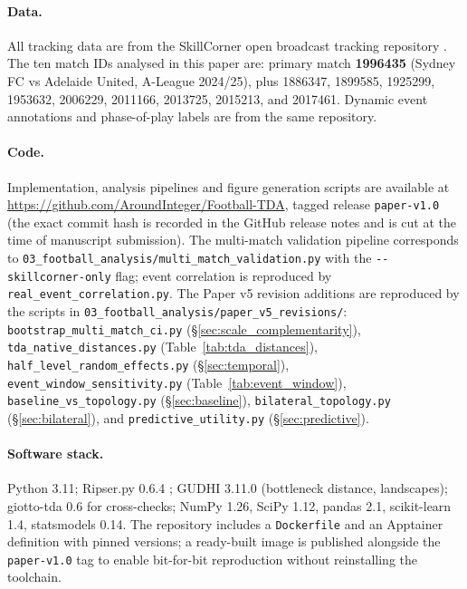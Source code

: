 \documentclass[11pt,a4paper]{article}
\begin{document}
\paragraph{Data.} All tracking data are from the SkillCorner open broadcast tracking repository \citep{SkillCorner2024}. The ten match IDs analysed in this paper are: primary match \textbf{1996435} (Sydney FC vs Adelaide United, A-League 2024/25), plus 1886347, 1899585, 1925299, 1953632, 2006229, 2011166, 2013725, 2015213, and 2017461. Dynamic event annotations and phase-of-play labels are from the same repository.

\paragraph{Code.} Implementation, analysis pipelines and figure generation scripts are available at \url{https://github.com/AroundInteger/Football-TDA}, tagged release \texttt{paper-v1.0} (the exact commit hash is recorded in the GitHub release notes and is cut at the time of manuscript submission). The multi-match validation pipeline corresponds to \texttt{03\_football\_analysis/multi\_match\_validation.py} with the \texttt{-{}-skillcorner-only} flag; event correlation is reproduced by \texttt{real\_event\_correlation.py}. The Paper v5 revision additions are reproduced by the scripts in \texttt{03\_football\_analysis/paper\_v5\_revisions/}: \texttt{bootstrap\_multi\_match\_ci.py} (\S\ref{sec:scale_complementarity}), \texttt{tda\_native\_distances.py} (Table~\ref{tab:tda_distances}), \texttt{half\_level\_random\_effects.py} (\S\ref{sec:temporal}), \texttt{event\_window\_sensitivity.py} (Table~\ref{tab:event_window}), \texttt{baseline\_vs\_topology.py} (\S\ref{sec:baseline}), \texttt{bilateral\_topology.py} (\S\ref{sec:bilateral}), and \texttt{predictive\_utility.py} (\S\ref{sec:predictive}).

\paragraph{Software stack.} Python 3.11; Ripser.py 0.6.4 \citep{Tralie2018}; GUDHI 3.11.0 (bottleneck distance, landscapes); giotto-tda 0.6 \citep{Tauzin2021} for cross-checks; NumPy 1.26, SciPy 1.12, pandas 2.1, scikit-learn 1.4, statsmodels 0.14. The repository includes a \texttt{Dockerfile} and an Apptainer definition with pinned versions; a ready-built image is published alongside the \texttt{paper-v1.0} tag to enable bit-for-bit reproduction without reinstalling the toolchain.
\end{document}
